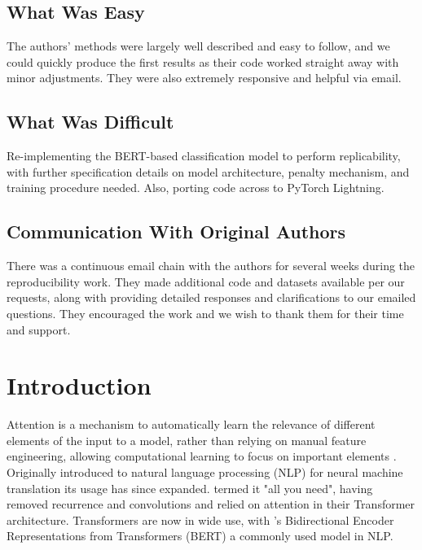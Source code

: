 \subsection*{What Was Easy}
The authors' methods were largely well described and easy to follow, and we could quickly produce the first results as their code worked straight away with minor adjustments. They were also extremely responsive and helpful via email.

\subsection*{What Was Difficult}
Re-implementing the BERT-based classification model to perform replicability, with further specification details on model architecture, penalty mechanism, and training procedure needed. Also, porting code across to PyTorch Lightning.

\subsection*{Communication With Original Authors}
There was a continuous email chain with the authors for several weeks during the reproducibility work. They made additional code and datasets available per our requests, along with providing detailed responses and clarifications to our emailed questions. They encouraged the work and we wish to thank them for their time and support.

\newpage


\section{Introduction}
Attention is a mechanism to automatically learn the relevance of different elements of the input to a model, rather than relying on manual feature engineering, allowing computational learning to focus on important elements \citep{galassi2020attention}.
Originally introduced to natural language processing (NLP) for neural machine translation \citep{bahdanau2014neural} its usage has since expanded. \citet{vaswani2017attention} termed it "all you need", having removed recurrence and convolutions and relied on attention in their Transformer architecture. Transformers are now in wide use, with \citet{devlin2018bert}'s Bidirectional Encoder Representations from Transformers (BERT) a commonly used model in NLP.

